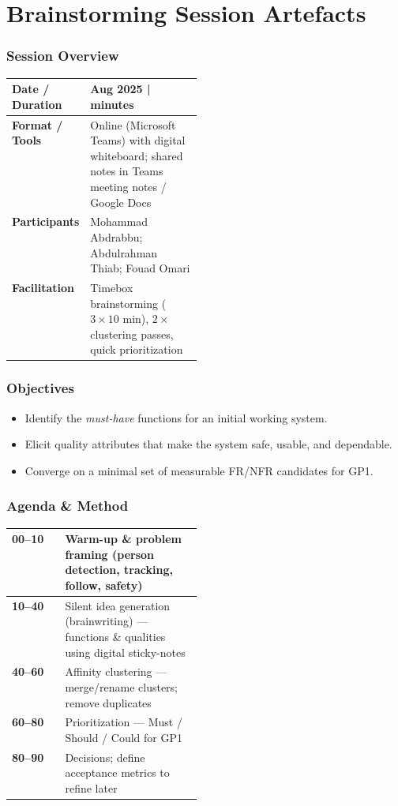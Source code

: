 \documentclass[12pt,a4paper]{report}
\begin{document}
\chapter{Brainstorming Session Artefacts}
\label{app:brainstorm}

\subsection*{Session Overview}
\begin{tabularx}{\linewidth}{|>{\raggedright\arraybackslash}p{0.28\linewidth}|>{\raggedright\arraybackslash}X|}
\hline
\textbf{Date / Duration} & 28 Aug 2025 \quad|\quad 90 minutes \\ \hline
\textbf{Format / Tools}  & Online (Microsoft Teams) with digital whiteboard; shared notes in Teams meeting notes / Google Docs \\ \hline
\textbf{Participants}    & Mohammad Abdrabbu; Abdulrahman Thiab; Fouad Omari \\ \hline
\textbf{Facilitation}    & Timebox brainstorming ($3\times10$ min), $2\times$ clustering passes, quick prioritization \\ \hline
\end{tabularx}

\subsection*{Objectives}
\begin{itemize}[leftmargin=*]
\item Identify the \textit{must-have} functions for an initial working system.
\item Elicit quality attributes that make the system safe, usable, and dependable.
\item Converge on a minimal set of measurable FR/NFR candidates for GP1.
\end{itemize}

\subsection*{Agenda \& Method}
\begin{tabularx}{\linewidth}{|>{\raggedright\arraybackslash}p{0.28\linewidth}|>{\raggedright\arraybackslash}X|}
\hline
\textbf{00–10} & Warm-up \& problem framing (person detection, tracking, follow, safety) \\ \hline
\textbf{10–40} & Silent idea generation (brainwriting) — functions \& qualities using digital sticky-notes \\ \hline
\textbf{40–60} & Affinity clustering — merge/rename clusters; remove duplicates \\ \hline
\textbf{60–80} & Prioritization — Must / Should / Could for GP1 \\ \hline
\textbf{80–90} & Decisions; define acceptance metrics to refine later \\ \hline
\end{tabularx}
\end{document}
